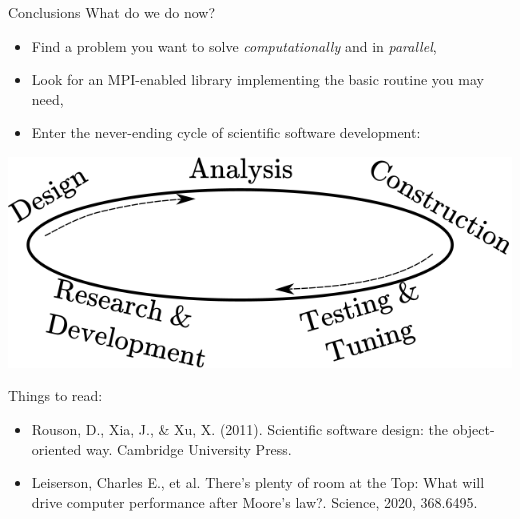 \documentclass[xcolor={svgnames,usenames}]{beamer}
\begin{document}
\begin{frame}{Conclusions}
	What do we do now?
	\begin{itemize}
		\item Find a problem you want to solve \emph{computationally} and in \emph{parallel},
		\item Look for an MPI-enabled library implementing the basic routine you may need,
		\item Enter the never-ending cycle of \alert{scientific software development}:
	\end{itemize}
	\begin{center}
		\includegraphics[width=0.5\columnwidth]{softwarecycle.png}
	\end{center}
	Things to read:
	\begin{itemize}
		\item \small Rouson, D., Xia, J., \& Xu, X. (2011). Scientific software design: the object-oriented way. Cambridge University Press.
		\item \small Leiserson, Charles E., et al. There’s plenty of room at the Top: What will drive computer performance after Moore’s law?. Science, 2020, 368.6495.
	\end{itemize}
\end{frame}
\end{document}
